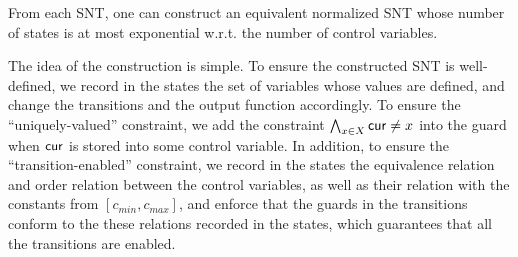 %
\begin{proposition}\label{prop-snt-norm}
	From each SNT, one can construct an equivalent normalized SNT whose number of states is at most exponential w.r.t. the number of control variables. 
\end{proposition}
%
The idea of the construction is simple. To ensure the constructed SNT is well-defined, we record in the states the set of variables whose values are defined, and change the transitions and the output function accordingly.
%
To ensure the ``uniquely-valued'' constraint, we add the constraint $\bigwedge_{x \in X} \mathsf{cur} \neq x$ into the guard when $\mathsf{cur}$ is stored into some control variable. In addition, to ensure the ``transition-enabled'' constraint, we record in the states the equivalence relation and order relation between the control variables, as well as their relation with the constants from $[c_{min}, c_{max}]$, and enforce that the guards in the transitions conform to the these relations recorded in the states, which guarantees that all the transitions are enabled.

